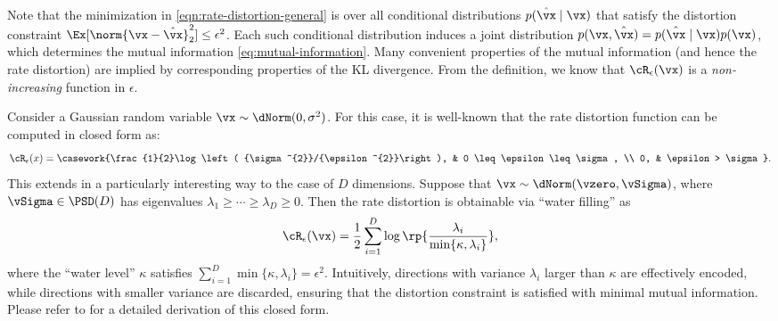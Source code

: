 \documentclass[../../book-main.tex]{subfiles}
\begin{document}
Note that the minimization
in \eqref{eqn:rate-distortion-general} is over all conditional
distributions $p(\hat \vx \mid \vx)$
that satisfy the distortion constraint $\Ex[\norm{\vx-
\hat \vx}_2^{2}] \le \epsilon^{2}$.
Each such conditional distribution induces a joint distribution $p(\vx,
\hat{\vx}) = p(\hat\vx \mid \vx) p(\vx)$, which determines the mutual
information \eqref{eq:mutual-information}.
Many convenient properties of the mutual information (and hence the rate
distortion) are implied by corresponding properties of the KL divergence.
From the definition, we know that $\cR_{\epsilon}(\vx)$ is a {\em
non-increasing} function in $\epsilon$.

\begin{example}\label{ex:gaussian_rate_distortion}
    Consider a Gaussian random variable \(\vx \sim \dNorm(0,
    \sigma^{2})\). For this case,
    it is well-known that the rate distortion function can be
    computed in closed form as:
    \begin{equation}
        \cR_{\epsilon}(x) =
        \casework{\frac{1}{2}\log\left(
            {\sigma^{2}}/{\epsilon^{2}}\right), & 0 \leq
        \epsilon \leq \sigma, \\ 0, & \epsilon > \sigma}.
    \end{equation}
    This extends in a particularly interesting way to the case of
    \(D\) dimensions. Suppose that \(\vx \sim \dNorm(\vzero,
    \vSigma)\), where  \(\vSigma \in \PSD(D)\) has eigenvalues
    \(\lambda_{1} \geq \cdots \geq \lambda_{D} \geq 0\). Then the
    rate distortion is obtainable via ``water filling'' as
    \begin{equation}
        \cR_{\epsilon}(\vx) = \frac{1}{2} \sum_{i =
        1}^{D}\log\rp{\frac{\lambda_{i}}{\min\{\kappa, \lambda_{i}\}}},
    \end{equation}
    where the ``water level'' \(\kappa\) satisfies \(\sum_{i =
    1}^{D}\min\{\kappa, \lambda_{i}\} = \epsilon^{2}\). Intuitively,
    directions with variance \(\lambda_{i}\) larger than \(\kappa\)
    are effectively encoded, while directions with smaller variance
    are discarded, ensuring that the distortion constraint is
    satisfied with minimal mutual information. Please refer to
     for a detailed derivation of this closed form.
\end{example}
\end{document}
